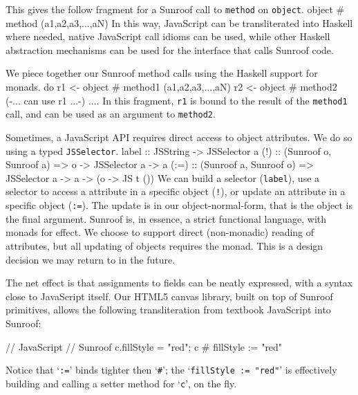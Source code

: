 \documentclass{llncs}
\newcommand{\Src}[1]{{\tt{#1}}}
\newenvironment{Code}{\verbatim}{\endverbatim}
\begin{document}
\noindent
This gives the follow fragment for a Sunroof call to \Src{method} on \Src{object}.
\begin{Code}
  object # method (a1,a2,a3,...,aN)
\end{Code}
In this way, JavaScript can be transliterated into Haskell where needed,
native JavaScript call idioms can be used,
while other Haskell abstraction mechanisms can be used for the interface that calls Sunroof code.

We piece together our Sunroof method calls using the Haskell support for monads.
\begin{Code}
  do r1 <- object # method1 (a1,a2,a3,...,aN)
     r2 <- object # method2 ({-... can use r1 ...-})
     ....
\end{Code} 
In this fragment, \Src{r1} is bound to the result of the \Src{method1} call,
and can be used as an argument to \Src{method2}.

Sometimes, a JavaScript API requires direct access to object attributes.
We do so using a typed \Src{JSSelector}.
\begin{Code}
label :: JSString -> JSSelector a
(!)   :: (Sunroof o, Sunroof a) 
      => o -> JSSelector a -> a
(:=)  :: (Sunroof a, Sunroof o) 
      => JSSelector a -> a -> (o -> JS t ())
\end{Code}
We can build a selector (\Src{label}), use a selector to access a attribute in a specific
object (\Src{!}), or update an attribute in a specific object (\Src{:=}).
The update is in our object-normal-form, that is the object is the final argument.
Sunroof is, in essence, a strict functional language, with monads for effect.
We choose to support direct (non-monadic) reading of attributes, but
all updating of objects requires the monad.
This is a design decision we may return to in the future.

The net effect is that assignments to fields can be neatly expressed,
with a syntax close to JavaScript itself. Our HTML5 canvas library,
built on top of Sunroof primitives, allows the following transliteration
from textbook JavaScript into Sunroof:

\begin{Code}
  // JavaScript                         // Sunroof
  c.fillStyle = "red";                  c # fillStyle := "red"
\end{Code}

Notice that `\Src{:=}' binds tighter then `\Src{\#}'; the `\Src{fillStyle := "red"}' is
effectively building and calling a setter method for `\Src{c}', on the fly.
\end{document}
